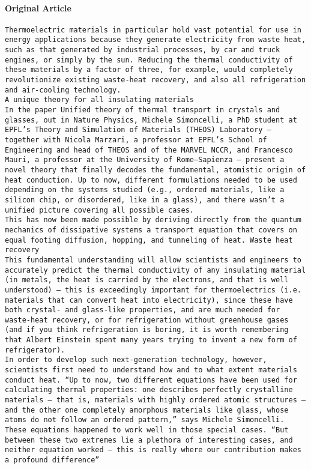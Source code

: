 \paragraph{\colorbox{YellowOrange}{Original Article}}
\texttt{Thermoelectric materials in particular hold vast potential for use in energy applications because they generate electricity from waste heat, such as that generated by industrial processes, by car and truck engines, or simply by the sun. Reducing the thermal conductivity of these materials by a factor of three, for example, would completely revolutionize existing waste-heat recovery, and also all refrigeration and air-cooling technology. \\
A unique theory for all insulating materials \\
In the paper Unified theory of thermal transport in crystals and glasses, out in Nature Physics, Michele Simoncelli, a PhD student at EPFL’s Theory and Simulation of Materials (THEOS) Laboratory – together with Nicola Marzari, a professor at EPFL’s School of Engineering and head of THEOS and of the MARVEL NCCR, and Francesco Mauri, a professor at the University of Rome–Sapienza – present a novel theory that finally decodes the fundamental, atomistic origin of heat conduction. Up to now, different formulations needed to be used depending on the systems studied (e.g., ordered materials, like a silicon chip, or disordered, like in a glass), and there wasn’t a unified picture covering all possible cases. \\
This has now been made possible by deriving directly from the quantum mechanics of dissipative systems a transport equation that covers on equal footing diffusion, hopping, and tunneling of heat.
Waste heat recovery \\
This fundamental understanding will allow scientists and engineers to accurately predict the thermal conductivity of any insulating material (in metals, the heat is carried by the electrons, and that is well understood) – this is exceedingly important for thermoelectrics (i.e. materials that can convert heat into electricity), since these have both crystal- and glass-like properties, and are much needed for waste-heat recovery, or for refrigeration without greenhouse gases (and if you think refrigeration is boring, it is worth remembering that Albert Einstein spent many years trying to invent a new form of refrigerator). \\
In order to develop such next-generation technology, however, scientists first need to understand how and to what extent materials conduct heat. “Up to now, two different equations have been used for calculating thermal properties: one describes perfectly crystalline materials – that is, materials with highly ordered atomic structures – and the other one completely amorphous materials like glass, whose atoms do not follow an ordered pattern,” says Michele Simoncelli. These equations happened to work well in those special cases. “But between these two extremes lie a plethora of interesting cases, and neither equation worked – this is really where our contribution makes a profound difference” \\
}
